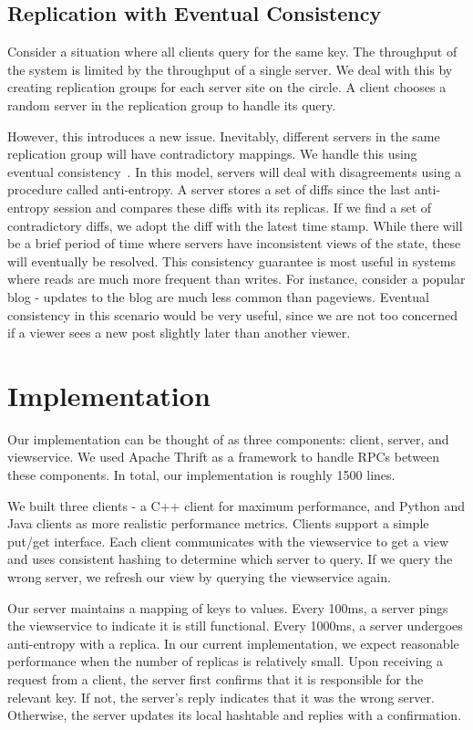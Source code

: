 \documentclass[letterpaper,11pt]{article}
\begin{document}
     \subsection{Replication with Eventual Consistency}
     Consider a situation where all clients query for the same key.
     The throughput of the system is limited by the throughput of a single server.
     We deal with this by creating replication groups for each server site on the circle.
     A client chooses a random server in the replication group to handle its query.

     However, this introduces a new issue.
     Inevitably, different servers in the same replication group will have contradictory mappings.
     We handle this using eventual consistency~\cite{bayou}.
     In this model, servers will deal with disagreements using a procedure called anti-entropy.
     A server stores a set of diffs since the last anti-entropy session and compares these diffs with its replicas.
     If we find a set of contradictory diffs, we adopt the diff with the latest time stamp.
     While there will be a brief period of time where servers have inconsistent views of the state, these will eventually be resolved.
     This consistency guarantee is most useful in systems where reads are much more frequent than writes.
     For instance, consider a popular blog - updates to the blog are much less common than pageviews.
     Eventual consistency in this scenario would be very useful, since we are not too concerned if a viewer sees a new post slightly later than another viewer.


     \section{Implementation}
     Our implementation can be thought of as three components: client, server, and viewservice.
     We used Apache Thrift as a framework to handle RPCs between these components.
     In total, our implementation is roughly 1500 lines.

     We built three clients - a C++ client for maximum performance, and Python and Java clients as more realistic performance metrics.
     Clients support a simple put/get interface.
     Each client communicates with the viewservice to get a view and uses consistent hashing to determine which server to query.
     If we query the wrong server, we refresh our view by querying the viewservice again.

     Our server maintains a mapping of keys to values.
     Every 100ms, a server pings the viewservice to indicate it is still functional.
     Every 1000ms, a server undergoes anti-entropy with a replica.
     In our current implementation, we expect reasonable performance when the number of replicas is relatively small.
     Upon receiving a request from a client, the server first confirms that it is responsible for the relevant key.
     If not, the server's reply indicates that it was the wrong server.
     Otherwise, the server updates its local hashtable and replies with a confirmation.
\end{document}
